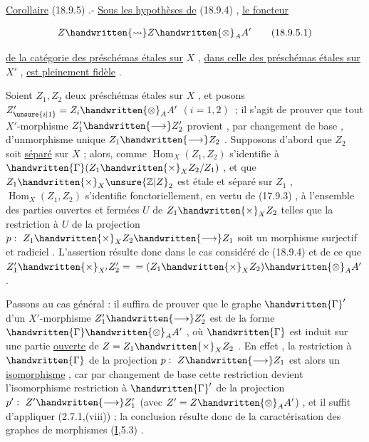 
\uline{Corollaire} (18.9.5) .- \uline{Sous les hypothèses de} (18.9.4) , \uline{le foncteur}

\[
Z\handwritten{\rightsquigarrow} Z\handwritten{\otimes}_A A'\tag*{(18.9.5.1)}
\]

\uline{de la catégorie des préschémas étales sur} $X$ , \uline{dans celle des préschémas étales sur} $X'$ , \uline{est pleinement fidèle} .

Soient $Z_1,Z_2$ deux préschémas étales sur $X$ , et posons $Z_{\unsure{i|1}}'=Z_i\handwritten{\otimes}_A A'$ $(i=1,2)$ \,;  il s'agit de prouver que tout $X'$-morphisme $Z_1'\handwritten{\longrightarrow} Z_2'$ provient , par changement de base , d'unmorphisme unique $Z_1\handwritten{\longrightarrow} Z_2$ .
Supposons d'abord que  $Z_2$ soit \uline{séparé} sur $X$ ; alors, comme $\operatorname{Hom}_X(Z_1,Z_2)$ s'identifie à  $\handwritten{\Gamma}(Z_1\handwritten{\times}_X Z_2/Z_1)$ , et que $Z_1\handwritten{\times}_X\unsure{\mathbb Z|Z}_2$ est étale et séparé sur $Z_1$ , $\operatorname{Hom}_X(Z_1,Z_2)$ s'identifie fonctoriellement, en vertu de (17.9.3) , à l'ensemble des parties ouvertes et fermées $U$ de $Z_1\handwritten{\times}_X Z_2$ telles que la restriction à $U$ de la projection $p:\ Z_1\handwritten{\times}_X Z_2\handwritten{\longrightarrow} Z_1$ soit un morphisme surjectif et radiciel . L'assertion résulte donc dans le cas considéré de (18.9.4) et de ce que $Z_1'\handwritten{\times}_{X'} Z_2'={}= (Z_1\handwritten{\times}_X Z_2)\handwritten{\otimes}_A A'$ .

Passons au cas général : il suffira de prouver que le graphe $\handwritten{\Gamma}'$ d'un $X'$-morphisme $Z_1'\handwritten{\longrightarrow} Z_2'$  est de la forme $\handwritten{\Gamma}\handwritten{\otimes}_A A'$ , où $\handwritten{\Gamma}$ est  induit sur une partie \uline{ouverte} de $Z=Z_1\handwritten{\times}_X Z_2$ . En effet , la restriction à $\handwritten{\Gamma}$ de la projection $p:\ Z\handwritten{\longrightarrow} Z_1$ est alors un \uline{isomorphisme} , car par changement de base  cette restriction devient l'isomorphisme restriction à $\handwritten{\Gamma}'$ de la projection $p':\ Z'\handwritten{\longrightarrow} Z_1'$ (avec $Z'=Z\handwritten{\otimes}_A A'$) , et il suffit d'appliquer (2.7.1,(viii)) ; la conclusion résulte donc  de la caractérisation des graphes de morphismes (\uline{I},5.3) .

